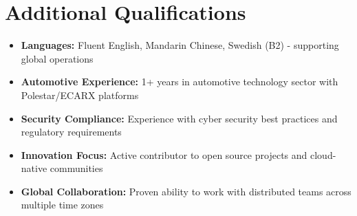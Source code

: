 \documentclass[11pt,a4paper]{article}
\begin{document}
\vspace{6pt}
\section*{Additional Qualifications}
\begin{itemize}[noitemsep]
\item \textbf{Languages:} Fluent English, Mandarin Chinese, Swedish (B2) - supporting global operations
\item \textbf{Automotive Experience:} 1+ years in automotive technology sector with Polestar/ECARX platforms
\item \textbf{Security Compliance:} Experience with cyber security best practices and regulatory requirements
\item \textbf{Innovation Focus:} Active contributor to open source projects and cloud-native communities
\item \textbf{Global Collaboration:} Proven ability to work with distributed teams across multiple time zones
\end{itemize}
\end{document}
